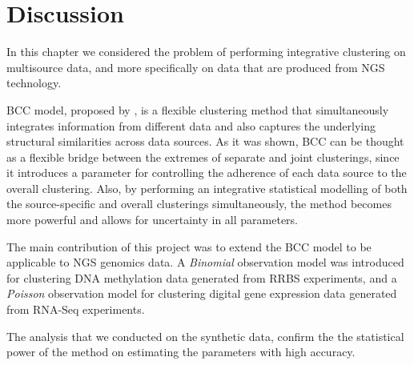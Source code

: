 \section{Discussion} \label{integr-discussion-sect}
In this chapter we considered the problem of performing integrative clustering on multisource data, and more specifically on data that are produced from NGS technology.

BCC model, proposed by \citet{Lock2013}, is a flexible clustering method that simultaneously integrates information from different data and also captures the underlying structural similarities across data sources. As it was shown, BCC can be thought as a flexible bridge between the extremes of separate and joint clusterings, since it introduces a parameter for controlling the adherence of each data source to the overall clustering. Also, by performing an integrative statistical modelling of both the source-specific and overall clusterings simultaneously, the method becomes more powerful and allows for uncertainty in all parameters.

The main contribution of this project was to extend the BCC model to be applicable to NGS genomics data. A \emph{Binomial} observation model was introduced for clustering DNA methylation data generated from RRBS experiments, and a \emph{Poisson} observation model for clustering digital gene expression data generated from RNA-Seq experiments. 

The analysis that we conducted on the synthetic data, confirm the the statistical power of the method on estimating the parameters with high accuracy. 



